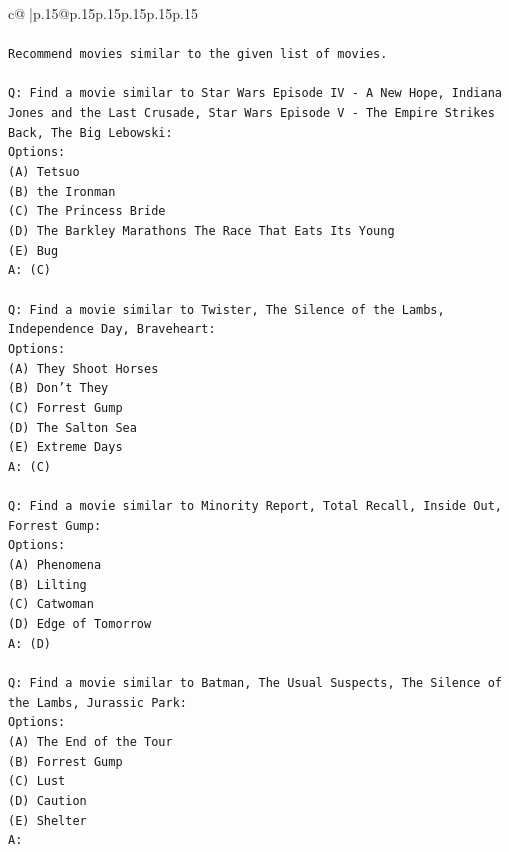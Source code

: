 \documentclass{article}
\begin{document}
{\begin{supertabular}{c@{$\;$}|p{.15\linewidth}@{}p{.15\linewidth}p{.15\linewidth}p{.15\linewidth}p{.15\linewidth}p{.15\linewidth}}
{{{\\ 
\\ 
\texttt{Recommend movies similar to the given list of movies.} \\
\\ 
\texttt{Q: Find a movie similar to Star Wars Episode IV {-} A New Hope, Indiana Jones and the Last Crusade, Star Wars Episode V {-} The Empire Strikes Back, The Big Lebowski:} \\
\texttt{Options:} \\
\texttt{(A) Tetsuo} \\
\texttt{(B) the Ironman} \\
\texttt{(C) The Princess Bride} \\
\texttt{(D) The Barkley Marathons The Race That Eats Its Young} \\
\texttt{(E) Bug} \\
\texttt{A: (C)} \\
\\ 
\texttt{Q: Find a movie similar to Twister, The Silence of the Lambs, Independence Day, Braveheart:} \\
\texttt{Options:} \\
\texttt{(A) They Shoot Horses} \\
\texttt{(B) Don't They} \\
\texttt{(C) Forrest Gump} \\
\texttt{(D) The Salton Sea} \\
\texttt{(E) Extreme Days} \\
\texttt{A: (C)} \\
\\ 
\texttt{Q: Find a movie similar to Minority Report, Total Recall, Inside Out, Forrest Gump:} \\
\texttt{Options:} \\
\texttt{(A) Phenomena} \\
\texttt{(B) Lilting} \\
\texttt{(C) Catwoman} \\
\texttt{(D) Edge of Tomorrow} \\
\texttt{A: (D)} \\
\\ 
\texttt{Q: Find a movie similar to Batman, The Usual Suspects, The Silence of the Lambs, Jurassic Park:} \\
\texttt{Options:} \\
\texttt{(A) The End of the Tour} \\
\texttt{(B) Forrest Gump} \\
\texttt{(C) Lust} \\
\texttt{(D) Caution} \\
\texttt{(E) Shelter} \\
\texttt{A:} \\
            }
        }
    }
     \\ \\


\end{supertabular}}
\end{document}
